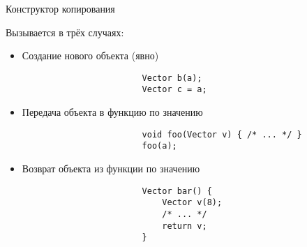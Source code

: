 \documentclass[aspectratio=169,14pt]{beamer}
\begin{document}
    \begin{frame}[fragile]{Конструктор копирования}
        \begin{block}{\normalsize Вызывается в трёх случаях:}
            \footnotesize
            \begin{itemize}
                \item<2-> Создание нового объекта (явно)
                    \begin{verbatim}
                        Vector b(a);
                        Vector c = a;
                    \end{verbatim}
                \item<3-> Передача объекта в функцию по значению
                    \begin{verbatim}
                        void foo(Vector v) { /* ... */ }
                        foo(a);
                    \end{verbatim}
                \item<4-> Возврат объекта из функции по значению
                    \begin{verbatim}
                        Vector bar() {
                            Vector v(8);
                            /* ... */
                            return v;
                        }
                    \end{verbatim}
            \end{itemize}
        \end{block}
    \end{frame}
\end{document}
